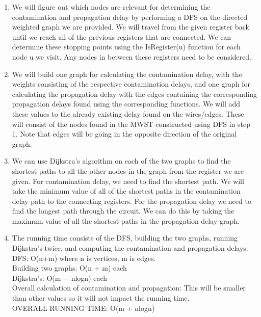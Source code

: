 \documentclass[12pt]{article}
\begin{document}
\begin{enumerate}
    \item We will figure out which nodes are relevant for determining the contamination and propagation delay by performing a DFS on the directed weighted graph we are provided. We will travel from the given register back until we reach all of the previous registers that are connected. We can determine these stopping points using the IsRegister(u) function for each node u we visit. Any nodes in between these registers need to be considered. \\
    
    \item We will build one graph for calculating the contamination delay, with the weights consisting of the respective contamination delays, and one graph for calculating the propagation delay with the edges containing the corresponding propagation delays found using the corresponding functions. We will add these values to the already existing delay found on the wires/edges. These will consist of the nodes found in the MWST constructed using DFS in step 1. Note that edges will be going in the opposite direction of the original graph. \\
    
    \item We can use Dijkstra's algorithm on each of the two graphs to find the shortest paths to all the other nodes in the graph from the register we are given. For contamination delay, we need to find the shortest path. We will take the minimum value of all of the shortest paths in the contamination delay path to the connecting registers. For the propagation delay we need to find the longest path through the circuit. We can do this by taking the maximum value of all the shortest paths in the propagation delay graph. \\

    \item The running time consists of the DFS, building the two graphs, running Dijkstra's twice, and computing the contamination and propagation delays.\\

    DFS: O(n+m) where n is vertices, m is edges.\\

    Building two graphs: O(n + m) each \\

    Dijkstra's: O(m + nlogn) each\\

    Overall calculation of contamination and propagation: This will be smaller than other values so it will not impact the running time.\\

    OVERALL RUNNING TIME: O(m + nlogn)
\end{enumerate}
\end{document}
